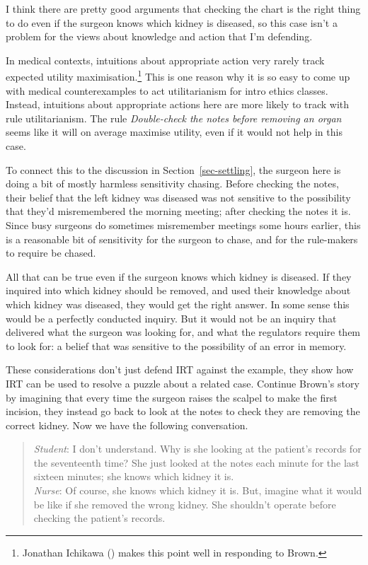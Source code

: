 \documentclass[
  10pt,
  letterpaper,
  twoside]{scrbook}
\begin{document}
I think there are pretty good arguments that checking the chart is the
right thing to do even if the surgeon knows which kidney is diseased, so
this case isn't a problem for the views about knowledge and action that
I'm defending.

In medical contexts, intuitions about appropriate action very rarely
track expected utility maximisation.\footnote{Jonathan Ichikawa
  () makes this point well in
  responding to Brown.} This is one reason why it is so easy to come up
with medical counterexamples to act utilitarianism for intro ethics
classes. Instead, intuitions about appropriate actions here are more
likely to track with rule utilitarianism. The rule \emph{Double-check
the notes before removing an organ} seems like it will on average
maximise utility, even if it would not help in this case.

To connect this to the discussion in Section~\ref{sec-settling}, the
surgeon here is doing a bit of mostly harmless sensitivity chasing.
Before checking the notes, their belief that the left kidney was
diseased was not sensitive to the possibility that they'd misremembered
the morning meeting; after checking the notes it is. Since busy surgeons
do sometimes misremember meetings some hours earlier, this is a
reasonable bit of sensitivity for the surgeon to chase, and for the
rule-makers to require be chased.

All that can be true even if the surgeon knows which kidney is diseased.
If they inquired into which kidney should be removed, and used their
knowledge about which kidney was diseased, they would get the right
answer. In some sense this would be a perfectly conducted inquiry. But
it would not be an inquiry that delivered what the surgeon was looking
for, and what the regulators require them to look for: a belief that was
sensitive to the possibility of an error in memory.

These considerations don't just defend IRT against the example, they
show how IRT can be used to resolve a puzzle about a related case.
Continue Brown's story by imagining that every time the surgeon raises
the scalpel to make the first incision, they instead go back to look at
the notes to check they are removing the correct kidney. Now we have the
following conversation.

\begin{quote}
\emph{Student}: I don't understand. Why is she looking at the patient's
records for the seventeenth time? She just looked at the notes each
minute for the last sixteen minutes; she knows which kidney it is.\\
\emph{Nurse}: Of course, she knows which kidney it is. But, imagine what
it would be like if she removed the wrong kidney. She shouldn't operate
before checking the patient's records.
\end{quote}
\end{document}
